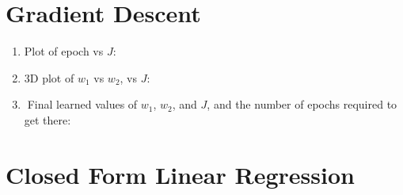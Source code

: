 \documentclass[12pt]{article}
\begin{document}
\newpage

\section{Gradient Descent}

	\begin{enumerate}
		
		\item Plot of epoch vs $J$:\\
		
		
		
		\item 3D plot of $w_1$ vs $w_2$, vs $J$:\\
		
		
		
		\item Final learned values of $w_1$, $w_2$, and $J$, and the number of epochs required to get there:\\
		
		
	\end{enumerate}
	


\section{Closed Form Linear Regression}
\end{document}
